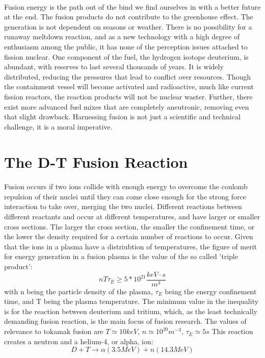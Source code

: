 \paragraph{}
Fusion energy is the path out of the bind we find ourselves in with a better future at the end.  The fusion products do not contribute to the greenhouse effect.  The generation is not dependent on seasons or weather.  There is no possibility for a runaway meltdown reaction, and as a new technology with a high degree of enthusiasm among the public, it has none of the perception issues attached to fission nuclear.  One component of the fuel, the hydrogen isotope deuterium, is abundant, with reserves to last several thousands of years.  It is widely distributed, reducing the pressures that lead to conflict over resources.    Though the containment vessel will become activated and radioactive, much like current fission reactors, the reaction products will not be nuclear waster.  Further, there exist more advanced fuel mixes that are completely aneutronic, removing even that slight drawback.  Harnessing fusion is not just a scientific and technical challenge, it is a moral imperative.

\section{The D-T Fusion Reaction}
\paragraph{}
Fusion occurs if two ions collide with enough energy to overcome the coulomb repulsion of their nuclei until they can come close enough for the strong force interaction to take over, merging the two nuclei.  Different reactions between different reactants and occur at different temperatures, and have larger or smaller cross sections.  The larger the cross section, the smaller the confinement time, or the lower the density required for a certain number of reactions to occur.  Given that the ions in a plasma have a distriubtion of temperatures, the figure of merit for energy generation in a fusion plasma is the value of the so called 'triple product':\begin{equation}
nT\tau_E \geq 5*10^{21} \frac{keV\cdot s}{m^3}
\end{equation} with n being the particle density of the plasma, $\tau_E$ being the energy confinement time, and T being the plasma temperature.  The minimum value in the inequality is for the reaction between deuterium and tritium, which, as the least technically demanding fusion reaction, is the main focus of fusion research.  The values of relevance to tokamak fusion are $T \simeq 10keV$, $n \simeq 10^{20}m^{-3}$, $\tau_E \simeq  5s$ This reaction creates a neutron and a helium-4, or alpha, ion:\begin{equation}
D+T \rightarrow \alpha(3.5MeV) + n(14.3 MeV)
\end{equation}

